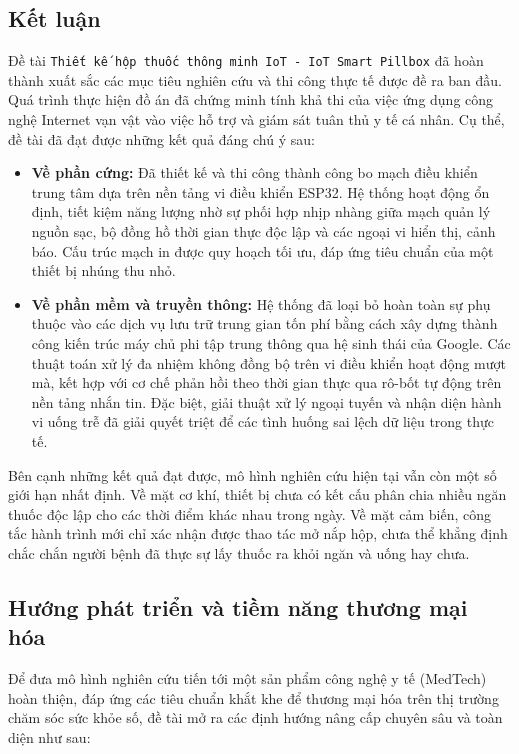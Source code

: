 \documentclass[12pt, a4paper, oneside]{article}
\begin{document}
\subsection{Kết luận}
Đề tài \texttt{Thiết kế hộp thuốc thông minh IoT - IoT Smart Pillbox} đã hoàn thành xuất sắc các mục tiêu nghiên cứu và thi công thực tế được đề ra ban đầu. Quá trình thực hiện đồ án đã chứng minh tính khả thi của việc ứng dụng công nghệ Internet vạn vật vào việc hỗ trợ và giám sát tuân thủ y tế cá nhân. Cụ thể, đề tài đã đạt được những kết quả đáng chú ý sau:

\begin{itemize}
    \item \textbf{Về phần cứng:} Đã thiết kế và thi công thành công bo mạch điều khiển trung tâm dựa trên nền tảng vi điều khiển ESP32. Hệ thống hoạt động ổn định, tiết kiệm năng lượng nhờ sự phối hợp nhịp nhàng giữa mạch quản lý nguồn sạc, bộ đồng hồ thời gian thực độc lập và các ngoại vi hiển thị, cảnh báo. Cấu trúc mạch in được quy hoạch tối ưu, đáp ứng tiêu chuẩn của một thiết bị nhúng thu nhỏ.
    \item \textbf{Về phần mềm và truyền thông:} Hệ thống đã loại bỏ hoàn toàn sự phụ thuộc vào các dịch vụ lưu trữ trung gian tốn phí bằng cách xây dựng thành công kiến trúc máy chủ phi tập trung thông qua hệ sinh thái của Google. Các thuật toán xử lý đa nhiệm không đồng bộ trên vi điều khiển hoạt động mượt mà, kết hợp với cơ chế phản hồi theo thời gian thực qua rô-bốt tự động trên nền tảng nhắn tin. Đặc biệt, giải thuật xử lý ngoại tuyến và nhận diện hành vi uống trễ đã giải quyết triệt để các tình huống sai lệch dữ liệu trong thực tế.
\end{itemize}

Bên cạnh những kết quả đạt được, mô hình nghiên cứu hiện tại vẫn còn một số giới hạn nhất định. Về mặt cơ khí, thiết bị chưa có kết cấu phân chia nhiều ngăn thuốc độc lập cho các thời điểm khác nhau trong ngày. Về mặt cảm biến, công tắc hành trình mới chỉ xác nhận được thao tác mở nắp hộp, chưa thể khẳng định chắc chắn người bệnh đã thực sự lấy thuốc ra khỏi ngăn và uống hay chưa.

\subsection{Hướng phát triển và tiềm năng thương mại hóa}
Để đưa mô hình nghiên cứu tiến tới một sản phẩm công nghệ y tế (MedTech) hoàn thiện, đáp ứng các tiêu chuẩn khắt khe để thương mại hóa trên thị trường chăm sóc sức khỏe số, đề tài mở ra các định hướng nâng cấp chuyên sâu và toàn diện như sau:
\end{document}
